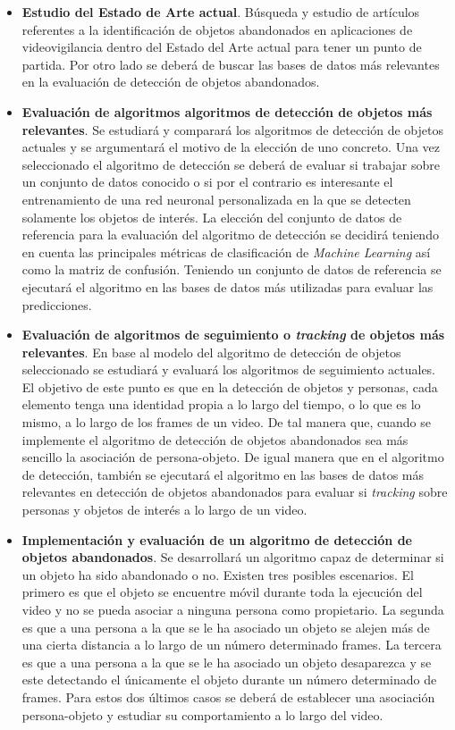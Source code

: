 \begin{itemize}
    \item \textbf{Estudio del Estado de Arte actual}. Búsqueda y estudio de artículos referentes a la identificación de objetos abandonados en aplicaciones de videovigilancia dentro del Estado del Arte actual para tener un punto de partida. Por otro lado se deberá de buscar las bases de datos más relevantes en la evaluación de detección de objetos abandonados.
    \item \textbf{Evaluación de algoritmos algoritmos de detección de objetos más relevantes}. Se estudiará y comparará los algoritmos de detección de objetos actuales y se argumentará el motivo de la elección de uno concreto. Una vez seleccionado el algoritmo de detección se deberá de evaluar si trabajar sobre un conjunto de datos conocido o si por el contrario es interesante el entrenamiento de una red neuronal personalizada en la que se detecten solamente los objetos de interés. La elección del conjunto de datos de referencia para la evaluación del algoritmo de detección se decidirá teniendo en cuenta las principales métricas de clasificación de \textit{Machine Learning} así como la matriz de confusión. Teniendo un conjunto de datos de referencia se ejecutará el algoritmo en las bases de datos más utilizadas para evaluar las predicciones.
    \item \textbf{Evaluación de algoritmos de seguimiento o \textit{tracking} de objetos más relevantes}. En base al modelo del algoritmo de detección de objetos seleccionado se estudiará y evaluará los algoritmos de seguimiento actuales. El objetivo de este punto es que en la detección de objetos y personas, cada elemento tenga una identidad propia a lo largo del tiempo, o lo que es lo mismo, a lo largo de los frames de un video. De tal manera que, cuando se implemente el algoritmo de detección de objetos abandonados sea más sencillo la asociación de persona-objeto. De igual manera que en el algoritmo de detección, también se ejecutará el algoritmo en las bases de datos más relevantes en detección de objetos abandonados para evaluar si \textit{tracking} sobre personas y objetos de interés a lo largo de un video.
    \item \textbf{Implementación y evaluación de un algoritmo de detección de objetos abandonados}. Se desarrollará un algoritmo capaz de determinar si un objeto ha sido abandonado o no. Existen tres posibles escenarios. El primero es que el objeto se encuentre móvil durante toda la ejecución del video y no se pueda asociar a ninguna persona como propietario. La segunda es que a una persona a la que se le ha asociado un objeto se alejen más de una cierta distancia a lo largo de un número determinado frames. La tercera es que a una persona a la que se le ha asociado un objeto desaparezca y se este detectando el únicamente el objeto durante un número determinado de frames. Para estos dos últimos casos se deberá de establecer una asociación persona-objeto y estudiar su comportamiento a lo largo del video.
\end{itemize}

